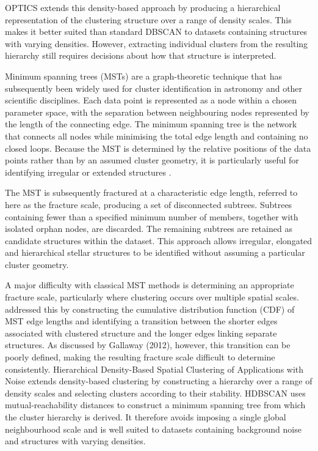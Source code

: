 \documentclass[fleqn,usenatbib]{mnras}
\begin{document}
OPTICS \citep{Ankerst1999}  extends this density-based approach by producing a hierarchical representation of the clustering structure over a range of density scales. This makes it better suited than standard DBSCAN to datasets containing structures with varying densities. However, extracting individual clusters from the resulting hierarchy still requires decisions about how that structure is interpreted.

Minimum spanning trees (MSTs) are a graph-theoretic technique \citep{Kruskal1956} that has subsequently been widely used for cluster identification in astronomy and other scientific disciplines. Each data point is represented as a node within a chosen parameter space, with the separation between neighbouring nodes represented by the length of the connecting edge. The minimum spanning tree is the network that connects all nodes while minimising the total edge length and containing no closed loops. Because the MST is determined by the relative positions of the data points rather than by an assumed cluster geometry, it is particularly useful for identifying irregular or extended structures \citep{Gallaway2012}.

The MST is subsequently fractured at a characteristic edge length, referred to here as the fracture scale, producing a set of disconnected subtrees. Subtrees containing fewer than a specified minimum number of members, together with isolated orphan nodes, are discarded. The remaining subtrees are retained as candidate structures within the dataset. This approach allows irregular, elongated and hierarchical stellar structures to be identified without assuming a particular cluster geometry. 

A major difficulty with classical MST methods is determining an appropriate fracture scale, particularly where clustering occurs over multiple spatial scales. \cite{Gutermuth2009} addressed this by constructing the cumulative distribution function (CDF) of MST edge lengths and identifying a transition between the shorter edges associated with clustered structure and the longer edges linking separate structures. As discussed by Gallaway (2012), however, this transition can
be poorly defined, making the resulting fracture scale difficult to determine consistently.
Hierarchical Density-Based Spatial Clustering of Applications with Noise \citep{Campello2015}
extends density-based clustering by constructing a hierarchy over a range of density scales and selecting clusters according to their stability. HDBSCAN uses mutual-reachability distances to construct a minimum spanning tree from which the cluster hierarchy is derived. It therefore avoids imposing a single global neighbourhood scale and is well suited to datasets containing background noise and structures with varying densities.
\end{document}
